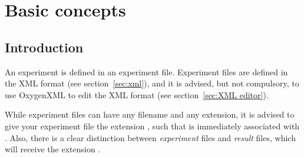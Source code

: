 \chapter{Basic concepts}
\label{chap:Basic concepts}
\section{Introduction}

An \apex experiment is defined in an experiment file. Experiment
files are defined in the XML format (see section~\ref{sec:xml}),
and it is advised, but not compulsory, to use OxygenXML to edit
the XML format (see section~\ref{sec:XML editor}).

While experiment files can have any filename and any extension, it
is advised to give your experiment file the extension
, such that is immediately associated with \apex.
Also, there is a clear distinction between \emph{experiment} files
and \emph{result} files, which will receive the extension
.



